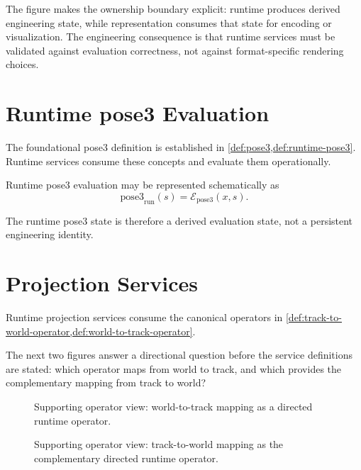 The figure makes the ownership boundary explicit: runtime produces
derived engineering state, while representation consumes that state for
encoding or visualization. The engineering consequence is that runtime
services must be validated against evaluation correctness, not against
format-specific rendering choices.

\section{Runtime pose3 Evaluation}

The foundational pose3 definition is established in
\cref{def:pose3,def:runtime-pose3}. Runtime services consume these
concepts and evaluate them operationally.

\begin{definition}
\label{def:runtime-pose3-evaluation}
Runtime pose3 evaluation may be represented schematically as
\[
\mathrm{pose3}_{\mathrm{run}}(s)
=
\mathcal E_{\mathrm{pose3}}(x,s).
\]
\end{definition}

The runtime pose3 state is therefore a derived evaluation state, not a
persistent engineering identity.

\section{Projection Services}

Runtime projection services consume the canonical operators in
\cref{def:track-to-world-operator,def:world-to-track-operator}.

The next two figures answer a directional question before the service
definitions are stated: which operator maps from world to track, and
which provides the complementary mapping from track to world?

\begin{figure}[ht]
\centering

\caption{Supporting operator view: world-to-track mapping as a directed runtime operator.}
\label{fig:support-world-to-track-operator}
\end{figure}

\begin{figure}[ht]
\centering

\caption{Supporting operator view: track-to-world mapping as the complementary directed runtime operator.}
\label{fig:support-track-to-world-operator}
\end{figure}

